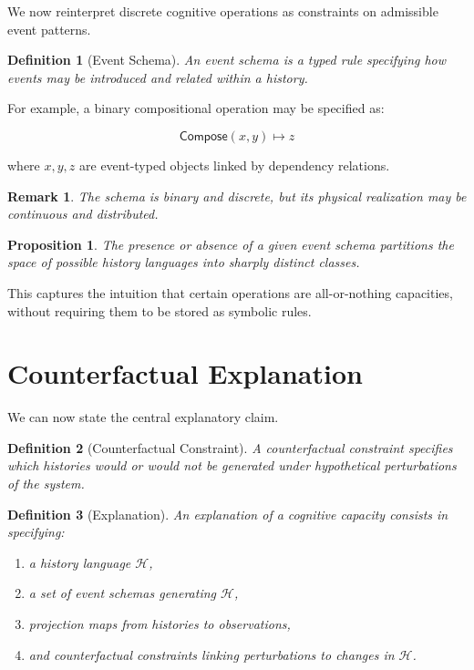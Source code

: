 \documentclass[11pt]{article}
\newtheorem{definition}{Definition}
\newtheorem{remark}{Remark}
\newtheorem{proposition}{Proposition}
\begin{document}
We now reinterpret discrete cognitive operations as constraints on admissible event patterns.

\begin{definition}[Event Schema]
An \emph{event schema} is a typed rule specifying how events may be introduced and related within a history.
\end{definition}

For example, a binary compositional operation may be specified as:

\[
\textsf{Compose}(x,y) \mapsto z
\]

where $x,y,z$ are event-typed objects linked by dependency relations.

\begin{remark}
The schema is binary and discrete, but its physical realization may be continuous and distributed.
\end{remark}

\begin{proposition}
The presence or absence of a given event schema partitions the space of possible history languages into sharply distinct classes.
\end{proposition}

This captures the intuition that certain operations are all-or-nothing capacities, without requiring them to be stored as symbolic rules.

\section{Counterfactual Explanation}

We can now state the central explanatory claim.

\begin{definition}[Counterfactual Constraint]
A counterfactual constraint specifies which histories would or would not be generated under hypothetical perturbations of the system.
\end{definition}

\begin{definition}[Explanation]
An explanation of a cognitive capacity consists in specifying:
\begin{enumerate}
  \item a history language $\mathcal{H}$,
  \item a set of event schemas generating $\mathcal{H}$,
  \item projection maps from histories to observations,
  \item and counterfactual constraints linking perturbations to changes in $\mathcal{H}$.
\end{enumerate}
\end{definition}
\end{document}
